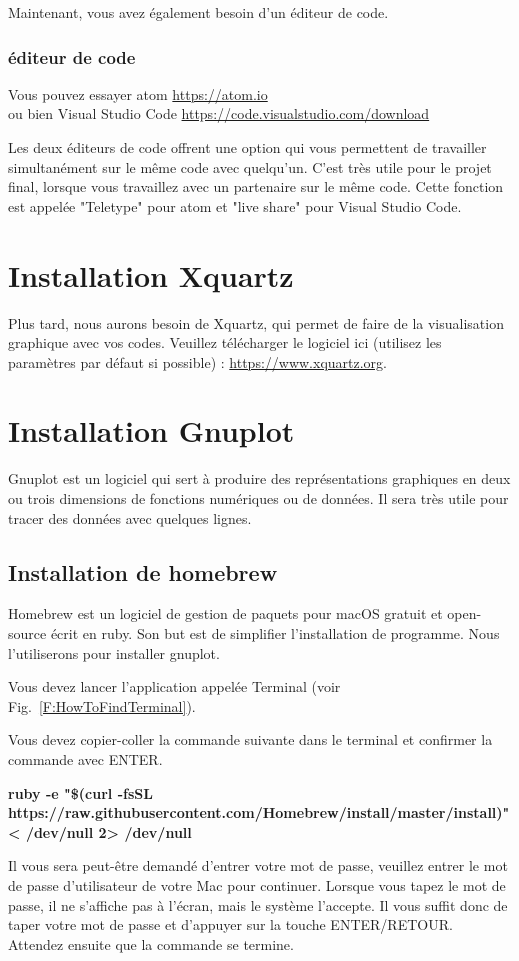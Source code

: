 \documentclass{article}
\newcommand\fig[1]{{Fig.~\ref{#1}}}
\begin{document}
Maintenant, vous avez également besoin d'un éditeur de code.
\subsubsection{éditeur de code\label{S:VisCodAtom}}
Vous pouvez essayer atom \href{https://atom.io}{https://atom.io}\\
ou bien Visual Studio Code \href{https://code.visualstudio.com/download}{https://code.visualstudio.com/download}

Les deux éditeurs de code offrent une option qui vous permettent de travailler simultanément sur le même code avec quelqu'un. C'est très utile pour le projet final, lorsque vous travaillez avec un partenaire sur le même code. Cette fonction est appelée "Teletype" pour atom et "live share" pour Visual Studio Code. 

\section{Installation Xquartz \label{S:InstallXquatz}}
Plus tard, nous aurons besoin de Xquartz, qui permet de faire de la visualisation graphique avec vos codes.
Veuillez télécharger le logiciel ici (utilisez les paramètres par défaut si possible) : \href{https://www.xquartz.org}{https://www.xquartz.org}.
\section{Installation Gnuplot}
Gnuplot est un logiciel qui sert à produire des représentations graphiques en deux ou trois dimensions de fonctions numériques ou de données. Il sera très utile pour tracer des données avec quelques lignes.
\subsection{Installation de homebrew}
Homebrew est un logiciel de gestion de paquets pour macOS gratuit et open-source écrit en ruby. Son but est de simplifier l'installation de programme. Nous l'utiliserons pour installer gnuplot.

Vous devez lancer l'application appelée Terminal (voir \fig{F:HowToFindTerminal}).

Vous devez copier-coller la commande suivante dans le terminal et confirmer la commande avec ENTER.
\begin{tcolorbox}[width=\textwidth,colframe=Bittersweet,colback={black},title={Ceci est le terminal},outer arc=0mm,colupper=white]    
      \large\textbf{ruby -e "\$(curl -fsSL https://raw.githubusercontent.com/Homebrew/install/master/install)" < /dev/null 2> /dev/null}
\end{tcolorbox}
Il vous sera peut-être demandé d'entrer votre mot de passe, veuillez entrer le mot de passe d'utilisateur de votre Mac pour continuer. Lorsque vous tapez le mot de passe, il ne s'affiche pas à l'écran, mais le système l'accepte. Il vous suffit donc de taper votre mot de passe et d'appuyer sur la touche ENTER/RETOUR. Attendez ensuite que la commande se termine.
\end{document}
